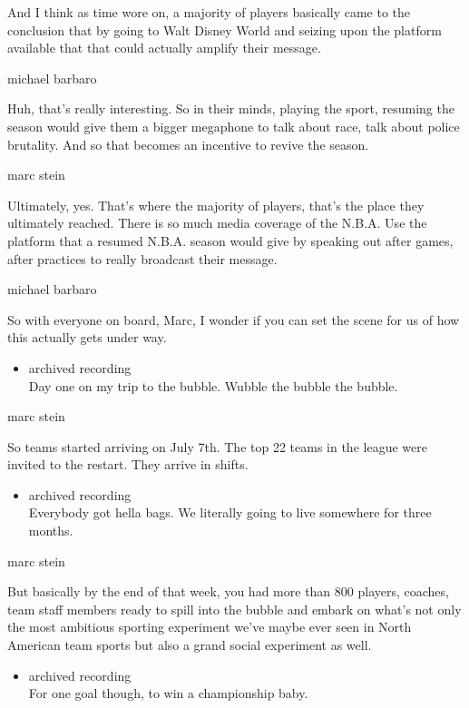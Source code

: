 And I think as time wore on, a majority of players basically came to the
conclusion that by going to Walt Disney World and seizing upon the
platform available that that could actually amplify their message.

michael barbaro

Huh, that's really interesting. So in their minds, playing the sport,
resuming the season would give them a bigger megaphone to talk about
race, talk about police brutality. And so that becomes an incentive to
revive the season.

marc stein

Ultimately, yes. That's where the majority of players, that's the place
they ultimately reached. There is so much media coverage of the N.B.A.
Use the platform that a resumed N.B.A. season would give by speaking out
after games, after practices to really broadcast their message.

michael barbaro

So with everyone on board, Marc, I wonder if you can set the scene for
us of how this actually gets under way.

\begin{itemize}
\tightlist
\item
  archived recording\\
  Day one on my trip to the bubble. Wubble the bubble the bubble.
\end{itemize}

marc stein

So teams started arriving on July 7th. The top 22 teams in the league
were invited to the restart. They arrive in shifts.

\begin{itemize}
\tightlist
\item
  archived recording\\
  Everybody got hella bags. We literally going to live somewhere for
  three months.
\end{itemize}

marc stein

But basically by the end of that week, you had more than 800 players,
coaches, team staff members ready to spill into the bubble and embark on
what's not only the most ambitious sporting experiment we've maybe ever
seen in North American team sports but also a grand social experiment as
well.

\begin{itemize}
\tightlist
\item
  archived recording\\
  For one goal though, to win a championship baby.
\end{itemize}

